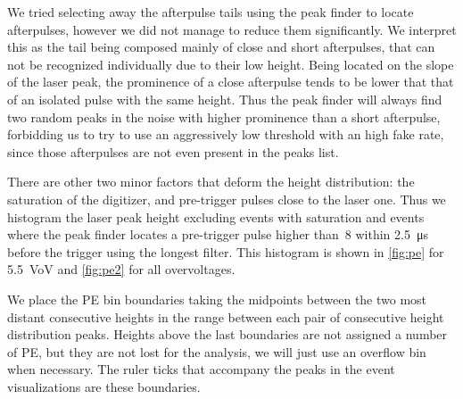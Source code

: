 \begin{figure}

    
    
\end{figure}

We tried selecting away the afterpulse tails using the peak finder to locate
afterpulses, however we did not manage to reduce them significantly. We
interpret this as the tail being composed mainly of close and short
afterpulses, that can not be recognized individually due to their low height.
Being located on the slope of the laser peak, the prominence of a close
afterpulse tends to be lower that that of an isolated pulse with the same
height. Thus the peak finder will always find two random peaks in the noise
with higher prominence than a short afterpulse, forbidding us to try to use an
aggressively low threshold with an high fake rate, since those afterpulses are
not even present in the peaks list.

There are other two minor factors that deform the height distribution: the
saturation of the digitizer, and pre-trigger pulses close to the laser one.
Thus we histogram the laser peak height excluding events with saturation and
events where the peak finder locates a pre-trigger pulse higher than~8 within
\SI{2.5}{\micro s} before the trigger using the longest filter. This
histogram is shown in \autoref{fig:pe} for \SI{5.5}{VoV} and \autoref{fig:pe2}
for all overvoltages.

\begin{figure}
    
    
    
\end{figure}

We place the PE bin boundaries taking the midpoints between the two most
distant consecutive heights in the range between each pair of consecutive
height distribution peaks. Heights above the last boundaries are not assigned a
number of PE, but they are not lost for the analysis, we will just use an
overflow bin when necessary. The ruler ticks that accompany the peaks in the
event visualizations are these boundaries.

